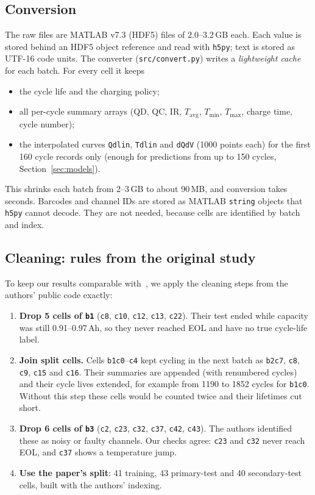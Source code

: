 \subsection{Conversion}
The raw files are MATLAB v7.3 (HDF5) files of 2.0--3.2\,GB each. Each value
is stored behind an HDF5 object reference and read with \texttt{h5py};
text is stored as UTF-16 code units. The converter
(\texttt{src/convert.py}) writes a \emph{lightweight cache} for each batch.
For every cell it keeps
\begin{itemize}
  \item the cycle life and the charging policy;
  \item all per-cycle summary arrays (QD, QC, IR, $T_\text{avg}$,
  $T_\text{min}$, $T_\text{max}$, charge time, cycle number);
  \item the interpolated curves \texttt{Qdlin}, \texttt{Tdlin} and
  \texttt{dQdV} (1000 points each) for the first 160 cycle records only
  (enough for predictions from up to 150 cycles, Section~\ref{sec:models}).
\end{itemize}
This shrinks each batch from 2--3\,GB to about 90\,MB, and conversion takes
seconds. Barcodes and channel IDs are stored as MATLAB \texttt{string}
objects that \texttt{h5py} cannot decode. They are not needed, because
cells are identified by batch and index.

\subsection{Cleaning: rules from the original study}
To keep our results comparable with~\cite{severson2019}, we apply the
cleaning steps from the authors' public code exactly:
\begin{enumerate}
  \item[\textbf{A1}] \textbf{Drop 5 cells of \texttt{b1}} (\texttt{c8},
  \texttt{c10}, \texttt{c12}, \texttt{c13}, \texttt{c22}). Their test ended
  while capacity was still 0.91--0.97\,Ah, so they never reached EOL and
  have no true cycle-life label.
  \item[\textbf{A2}] \textbf{Join split cells.} Cells \texttt{b1c0}--\texttt{c4}
  kept cycling in the next batch as \texttt{b2c7}, \texttt{c8}, \texttt{c9},
  \texttt{c15} and \texttt{c16}. Their summaries are appended (with
  renumbered cycles) and their cycle lives extended, for example from 1190
  to 1852 cycles for \texttt{b1c0}. Without this step these cells would be
  counted twice and their lifetimes cut short.
  \item[\textbf{A3}] \textbf{Drop 6 cells of \texttt{b3}} (\texttt{c2},
  \texttt{c23}, \texttt{c32}, \texttt{c37}, \texttt{c42}, \texttt{c43}).
  The authors identified these as noisy or faulty channels. Our checks
  agree: \texttt{c23} and \texttt{c32} never reach EOL, and \texttt{c37}
  shows a temperature jump.
  \item[\textbf{A4}] \textbf{Use the paper's split}: 41 training, 43
  primary-test and 40 secondary-test cells, built with the authors'
  indexing.
\end{enumerate}


